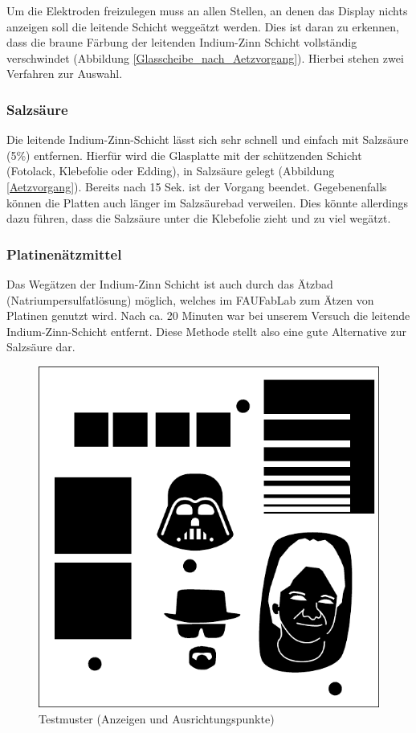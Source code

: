 Um die Elektroden freizulegen muss an allen Stellen, an denen das Display nichts anzeigen soll die leitende Schicht weggeätzt werden. Dies ist daran zu erkennen, dass die braune Färbung der leitenden Indium-Zinn Schicht vollständig verschwindet (Abbildung \ref{Glasscheibe_nach_Aetzvorgang}). Hierbei stehen zwei Verfahren zur Auswahl.\\

\subsubsection*{Salzsäure}

Die leitende Indium-Zinn-Schicht lässt sich sehr schnell und einfach mit Salzsäure (5\%) entfernen. Hierfür wird die Glasplatte mit der schützenden Schicht (Fotolack, Klebefolie oder Edding), in Salzsäure gelegt (Abbildung \ref{Aetzvorgang}). Bereits nach 15 Sek. ist der Vorgang beendet. Gegebenenfalls können die Platten auch länger im Salzsäurebad verweilen. Dies könnte allerdings dazu führen, dass die Salzsäure unter die Klebefolie zieht und zu viel wegätzt.

\subsubsection*{Platinenätzmittel}
Das Wegätzen der Indium-Zinn Schicht ist auch durch das Ätzbad (Natriumpersulfatlösung) möglich, welches im FAUFabLab zum Ätzen von Platinen genutzt wird. Nach ca. 20 Minuten war bei unserem Versuch die leitende Indium-Zinn-Schicht entfernt. Diese Methode stellt also eine gute Alternative zur Salzsäure dar.

\begin{figure}[t]
  \centering
  \includegraphics[width=0.5\linewidth, keepaspectratio]{Bilder/testmuster}
  \caption{Testmuster (Anzeigen und Ausrichtungspunkte)}
  \label{testmuster}
\end{figure}


